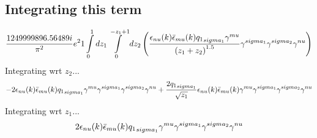 \subsection*{Integrating this term}
\begin{dmath}\frac{1249999896.56489 i}{\pi^{2}} e^{2}1\int\limits_{ 0 }^{ 1 } d{ z_{ 1 } }\int\limits_{ 0 }^{ - { z_{ 1 } } + 1 } d{ z_{ 2 } }\left(\frac{\epsilon_{ \\nu }({ k }) \bar{\epsilon}_{ \\mu }({ k }) { { q_1 }_{ \\sigma_1 } } { \gamma^{ \\mu } }}{\left({ z_{ 1 } } + { z_{ 2 } }\right)^{1.5}} { \gamma^{ \\sigma_1 } } { \gamma^{ \\sigma_2 } } { \gamma^{ \\nu } }\right)\end{dmath}
Integrating wrt ${ z_{ 2 } }$...
\begin{dmath}- 2 \epsilon_{ \\nu }({ k }) \bar{\epsilon}_{ \\mu }({ k }) { { q_1 }_{ \\sigma_1 } } { \gamma^{ \\mu } } { \gamma^{ \\sigma_1 } } { \gamma^{ \\sigma_2 } } { \gamma^{ \\nu } } + \frac{2 { { q_1 }_{ \\sigma_1 } }}{\sqrt{{ z_{ 1 } }}} \epsilon_{ \\nu }({ k }) \bar{\epsilon}_{ \\mu }({ k }) { \gamma^{ \\mu } } { \gamma^{ \\sigma_1 } } { \gamma^{ \\sigma_2 } } { \gamma^{ \\nu } }\end{dmath}
Integrating wrt ${ z_{ 1 } }$...
\begin{dmath}2 \epsilon_{ \\nu }({ k }) \bar{\epsilon}_{ \\mu }({ k }) { { q_1 }_{ \\sigma_1 } } { \gamma^{ \\mu } } { \gamma^{ \\sigma_1 } } { \gamma^{ \\sigma_2 } } { \gamma^{ \\nu } }\end{dmath}
